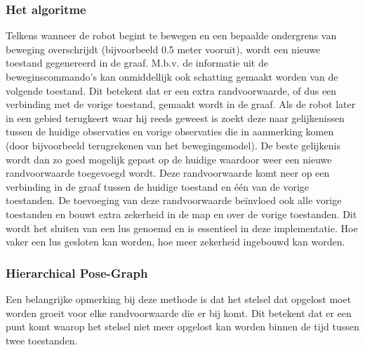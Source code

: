 \documentclass{book}
\begin{document}
\subsubsection{Het algoritme}\cite{graph}
Telkens wanneer de robot begint te bewegen en een bepaalde ondergrens van beweging overschrijdt (bijvoorbeeld 0.5 meter vooruit), wordt een nieuwe toestand gegenereerd in de graaf. M.b.v. de informatie uit de beweginscommando's kan onmiddellijk ook schatting gemaakt worden van de volgende toestand. Dit betekent dat er een extra randvoorwaarde, of dus een verbinding met de vorige toestand, gemaakt wordt in de graaf. Als de robot later in een gebied terugkeert waar hij reeds geweest is zoekt deze naar gelijkenissen tussen de huidige observaties en vorige observaties die in aanmerking komen (door bijvoorbeeld terugrekenen van het bewegingsmodel). De beste gelijkenis wordt dan zo goed mogelijk gepast op de huidige waardoor weer een nieuwe randvoorwaarde toegevoegd wordt. Deze randvoorwaarde komt neer op een verbinding in de graaf tussen de huidige toestand en één van de vorige toestanden. De toevoeging van deze randvoorwaarde beïnvloed ook alle vorige toestanden en bouwt extra zekerheid in de map en over de vorige toestanden. Dit wordt het sluiten van een lus genoemd en is essentieel in deze implementatie. Hoe vaker een lus gesloten kan worden, hoe meer zekerheid ingebouwd kan worden.  
\subsubsection{Hierarchical Pose-Graph} 
Een belangrijke opmerking bij deze methode is dat het stelsel dat opgelost moet worden groeit voor elke randvoorwaarde die er bij komt. Dit betekent dat er een punt komt waarop het stelsel niet meer opgelost kan worden binnen de tijd tussen twee toestanden. %
\end{document}
